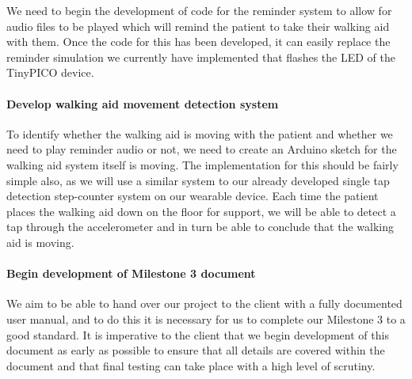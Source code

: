{We need to begin the development of code for the reminder system to allow for audio files to be played which will remind the patient to take their walking aid with them. Once the code for this has been developed, it can easily replace the reminder simulation we currently have implemented that flashes the LED of the TinyPICO device.

\paragraph{Develop walking aid movement detection system}

To identify whether the walking aid is moving with the patient and whether we need to play reminder audio or not, we need to create an Arduino sketch for the walking aid system itself is moving. The implementation for this should be fairly simple also, as we will use a similar system to our already developed single tap detection step-counter system on our wearable device. Each time the patient places the walking aid down on the floor for support, we will be able to detect a tap through the accelerometer and in turn be able to conclude that the walking aid is moving.

\paragraph{Begin development of Milestone 3 document}

We aim to be able to hand over our project to the client with a fully documented user manual, and to do this it is necessary for us to complete our Milestone 3 to a good standard. It is imperative to the client that we begin development of this document as early as possible to ensure that all details are covered within the document and that final testing can take place with a high level of scrutiny.

}
